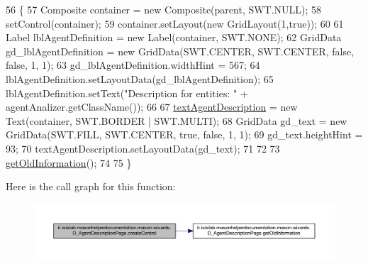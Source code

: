 \begin{DoxyCode}
56                                                 \{
57         Composite container = \textcolor{keyword}{new} Composite(parent, SWT.NULL);
58         setControl(container);
59         container.setLayout(\textcolor{keyword}{new} GridLayout(1,\textcolor{keyword}{true}));
60         
61         Label lblAgentDefinition = \textcolor{keyword}{new} Label(container, SWT.NONE);
62         GridData gd\_lblAgentDefinition = \textcolor{keyword}{new} GridData(SWT.CENTER, SWT.CENTER, \textcolor{keyword}{false}, \textcolor{keyword}{false}, 1, 1);
63         gd\_lblAgentDefinition.widthHint = 567;
64         lblAgentDefinition.setLayoutData(gd\_lblAgentDefinition);
65         lblAgentDefinition.setText(\textcolor{stringliteral}{"Description for entities: "} + agentAnalizer.getClassName());
66 
67         \hyperlink{classit_1_1isislab_1_1masonhelperdocumentation_1_1mason_1_1wizards_1_1_d___agent_description_page_adeaf5a5649c9280ceb38690357c70a1b}{textAgentDescription} = \textcolor{keyword}{new} Text(container, SWT.BORDER | SWT.MULTI);
68         GridData gd\_text = \textcolor{keyword}{new} GridData(SWT.FILL, SWT.CENTER, \textcolor{keyword}{true}, \textcolor{keyword}{false}, 1, 1);
69         gd\_text.heightHint = 93;
70         textAgentDescription.setLayoutData(gd\_text);
71 
72         
73         \hyperlink{classit_1_1isislab_1_1masonhelperdocumentation_1_1mason_1_1wizards_1_1_d___agent_description_page_aa774dfe04837b0b796d9e292aa3935be}{getOldInformation}();
74         
75     \}
\end{DoxyCode}


Here is the call graph for this function\-:
\nopagebreak
\begin{figure}[H]
\begin{center}
\leavevmode
\includegraphics[width=350pt]{classit_1_1isislab_1_1masonhelperdocumentation_1_1mason_1_1wizards_1_1_d___agent_description_page_a54ede11092f7bd9db6cc381862180450_cgraph}
\end{center}
\end{figure}


